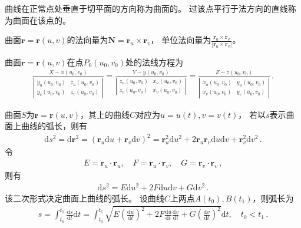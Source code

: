 \begin{definition}
    曲线在正常点处垂直于切平面的方向称为曲面的。
    过该点平行于法方向的直线称为曲面在该点的。
\end{definition}
\begin{corollary}
    曲面$\bm r=\bm r(u,v)$的法向量为$\displaystyle\bm N=\bm r_u\times\bm r_v$，
    单位法向量为$\displaystyle\frac{\bm r_u\times\bm r_v}{|\bm r_u\times\bm r_v|}$。
\end{corollary}
\begin{corollary}
    曲面$\bm r=\bm r(u,v)$在点$P_0(u_0,v_0)$处的法线方程为
    \begin{align}\label{eq:03ex01.17}
        \frac{X-x(u_0,v_0)}{\left|
            \begin{array}{cc}
                y_u(u_0,v_0) & z_u(u_0,v_0) \\
                y_v(u_0,v_0) & z_v(u_0,v_0)
            \end{array}
            \right|}=\frac{Y-y(u_0,v_0)}{\left|
            \begin{array}{cc}
                z_u(u_0,v_0) & x_u(u_0,v_0) \\
                z_v(u_0,v_0) & x_v(u_0,v_0)
            \end{array}
            \right|}=\frac{Z-z(u_0,v_0)}{\left|
            \begin{array}{cc}
                x_u(u_0,v_0) & y_u(u_0,v_0) \\
                x_v(u_0,v_0) & y_v(u_0,v_0)
            \end{array}
            \right|}\, .
    \end{align}
\end{corollary}

曲面$S$为$\bm r=\bm r(u,v)$，其上的曲线$C$对应为$u=u(t),v=v(t)$，
若以$s$表示曲面上曲线的弧长，则有
\begin{align}\label{eq:03ex01.18}
    \mathrm{d}s^2=\mathrm{d}\bm r^2=(\bm r_u\mathrm{d}u+\bm r_v\mathrm{d}v)^2=\bm r_u^2\mathrm{d}u^2+2\bm r_u\bm r_v\mathrm{d}u\mathrm{d}v+\bm r_v^2\mathrm{d}v^2\, .
\end{align}
令
\begin{align}\label{eq:03ex01.19}
    E=\bm r_u\cdot\bm r_u,\quad F=\bm r_u\cdot\bm r_v,\quad G=\bm r_v\cdot\bm r_v\, ,
\end{align}
则有
\begin{align}\label{eq:03ex01.20}
    \mathrm{d}s^2=E\mathrm{d}u^2+2F\mathrm{d}u\mathrm{d}v+G\mathrm{d}v^2\, .
\end{align}
该二次形式决定曲面上曲线的弧长。
设曲线$C$上两点$A(t_0),B(t_1)$，则弧长为
\begin{align}\label{eq:03ex01.21}
    s=\int_{t_0}^{t_1}{\frac{\mathrm{d}s}{\mathrm{d}t}\mathrm{d}t}=\int_{t_0}^{t_1}
    {\sqrt{E\left(\frac{\mathrm{d}u}{\mathrm{d}t}\right)^2+
        2F\frac{\mathrm{d}u}{\mathrm{d}t}\frac{\mathrm{d}v}{\mathrm{d}t}+
        G\left(\frac{\mathrm{d}v}{\mathrm{d}t}\right)^2}
    \mathrm{d}t},\quad t_0<t_1\, .
\end{align}

